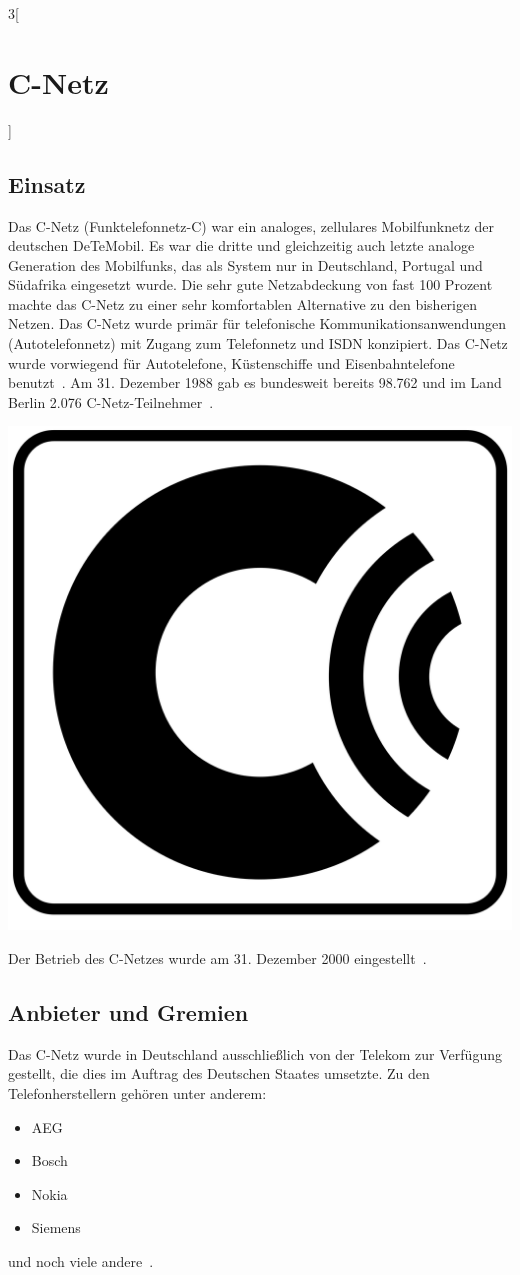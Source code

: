 \begin{multicols}{3}[\section{C-Netz}]
\subsection*{Einsatz}
Das C-Netz (Funktelefonnetz-C) war ein analoges, zellulares Mobilfunknetz der deutschen DeTeMobil. Es war die dritte und gleichzeitig auch letzte analoge Generation des Mobilfunks, das als System nur in Deutschland, Portugal und Südafrika eingesetzt wurde. Die sehr gute Netzabdeckung von fast 100 Prozent machte das C-Netz zu einer sehr komfortablen Alternative zu den bisherigen Netzen. Das C-Netz wurde primär für telefonische Kommunikationsanwendungen (Autotelefonnetz) mit Zugang zum Telefonnetz und ISDN konzipiert. Das C-Netz wurde vorwiegend für Autotelefone, Küstenschiffe und Eisenbahntelefone benutzt~\cite{c-netz.1}.
Am 31. Dezember 1988 gab es bundesweit bereits 98.762 und im Land Berlin 2.076 C-Netz-Teilnehmer~\cite{c-netz.3}.
\begin{Figure}
\includegraphics[width=\linewidth]{Kapitel/C-Netz/Grafiken/C-Netz_Logo.png}
\label{fig:c-netz.logo}
\end{Figure}
Der Betrieb des C-Netzes wurde am 31. Dezember 2000 eingestellt~\cite{c-netz.6}.

\subsection*{Anbieter und Gremien}
Das C-Netz wurde in Deutschland ausschließlich von der Telekom zur Verfügung gestellt, die dies im Auftrag des Deutschen Staates umsetzte. Zu den Telefonherstellern gehören unter anderem: 
\begin{itemize}
	\item AEG
	\item Bosch
	\item Nokia
	\item Siemens
\end{itemize}
und noch viele andere~\cite{c-netz.5}.

\end{multicols}
\newpage
